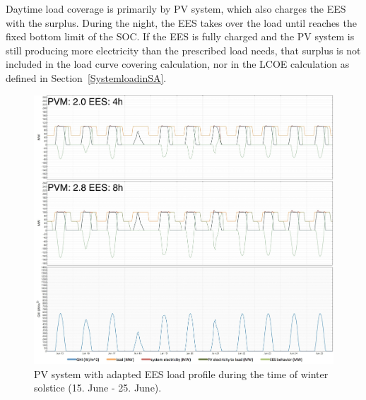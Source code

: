 
Daytime load coverage is primarily by PV system, which also charges the EES with the surplus. During the night, the EES takes over the load until reaches the fixed bottom limit of the SOC. If the EES is fully charged and the PV system is still producing more electricity than the prescribed load needs, that surplus is not included in the load curve covering calculation, nor in the LCOE calculation as defined in Section~\ref{SystemloadinSA}. 


\begin{figure}[!bhtp]  
\centering
\includegraphics[width=1\linewidth]{FIG/PV_winter_load}
\caption[PV system with adapted EES load profile during the time of winter solstice.]{PV system with adapted EES load profile during the time of winter solstice (15. June - 25. June).}\label{PV_winter_load}
\end{figure}

